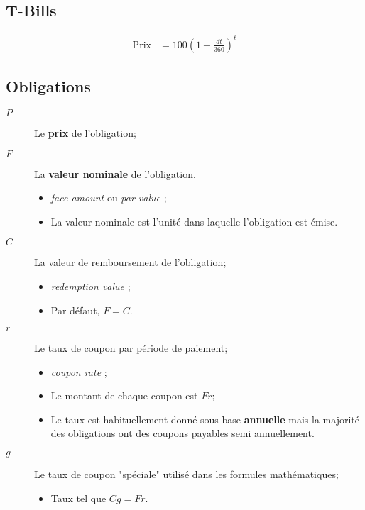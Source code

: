 \documentclass[10pt, french]{article}
\begin{document}
\begin{multicols*}{2}
\subsection*{T-Bills}

\begin{align*}
	\textrm{Prix}	
	&=	100 \left( 1 - \frac{dt}{360} \right)^{t}
\end{align*}

\columnbreak

\subsection*{Obligations}

\begin{distributions}[Notation]
\begin{description}
	\item[$P$]	Le \textbf{prix} de l'obligation;
	\item[$F$]	La \textbf{valeur nominale} de l'obligation.
		\begin{itemize}[leftmargin = *]
		\item	\og \textit{face amount} \fg{} ou \og \textit{par value} \fg{};
		\item	La valeur nominale est l'unité dans laquelle l'obligation est émise.
		\end{itemize}
	\item[$C$]	La valeur de remboursement de l'obligation;
		\begin{itemize}[leftmargin = *]
		\item	\og \textit{redemption value} \fg{};
		\item	Par défaut, $F = C$.
		\end{itemize}
	\item[$r$]	Le taux de coupon par période de paiement;
		\begin{itemize}[leftmargin = *]
		\item	\og \textit{coupon rate} \fg{};
		\item	Le montant de chaque coupon est $Fr$;
		\item	Le taux est habituellement donné sous base \textbf{annuelle} mais la majorité des obligations ont des coupons payables semi annuellement.
		\end{itemize}
	\item[$g$]	Le taux de coupon "spéciale" utilisé dans les formules mathématiques;
		\begin{itemize}[leftmargin = *]
		\item	Taux tel que $Cg = Fr$.

\end{itemize}
\end{description}
\end{distributions}
\end{multicols*}
\end{document}
